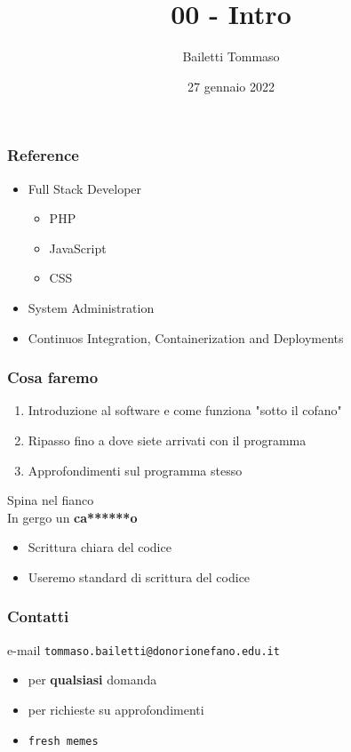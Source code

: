 \documentclass{beamer}
\title{00 - Intro}
\author{Bailetti Tommaso}
\institute{ITI Don Orione}
\date{27 gennaio 2022}
\begin{document}
    \begin{frame}
        \titlepage
    \end{frame}
    \begin{frame}
        \frametitle{Reference}

        \begin{itemize}
            \item<1-> Full Stack Developer
            \begin{itemize}
                \item PHP
                \item JavaScript
                \item CSS
            \end{itemize}
            \item<2-> System Administration
            \item<3-> Continuos Integration, Containerization and Deployments
        \end{itemize}

    \end{frame}
    \begin{frame}
        \frametitle{Cosa faremo}
    
        \begin{enumerate}
            \item<1-> Introduzione al software e come funziona "sotto il cofano"
            \item<2-> Ripasso fino a dove siete arrivati con il programma
            \item<3-> Approfondimenti sul programma stesso
        \end{enumerate}
        
    \end{frame}
    \begin{frame}

        \begin{center}
            \Huge{Spina nel fianco} \\
            \pause
            \large{In gergo un \textbf{ca******o}}
        \end{center}
        \begin{itemize}
            \item Scrittura chiara del codice
            \item Useremo standard di scrittura del codice
        \end{itemize}

    \end{frame}
    \begin{frame}
        \frametitle{Contatti}

        \begin{block}{e-mail}
            \texttt{tommaso.bailetti@donorionefano.edu.it}
        \end{block}
        \begin{itemize}
            \item per \textbf{qualsiasi} domanda
            \item per richieste su approfondimenti
            \item \texttt{fresh memes}
        \end{itemize}

    \end{frame}
\end{document}

